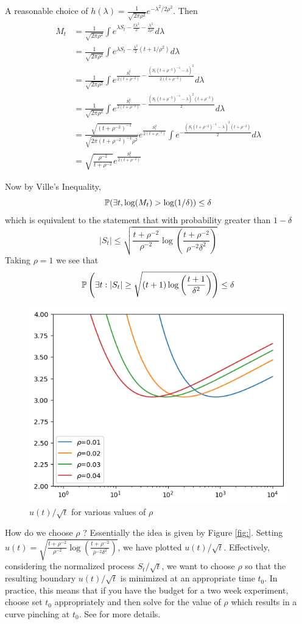 A reasonable choice of $h(\lambda) = \frac{1}{\sqrt{2\pi \rho^2}} e^{-\lambda^2/2\rho^2}$. Then
\begin{align*}
    M_t
    &= \frac{1}{\sqrt{2\pi \rho^2}} \int e^{\lambda S_t - \frac{t\lambda^2}{2} - \frac{\lambda^2}{2\rho^2} } d\lambda \\
    &= \frac{1}{\sqrt{2\pi \rho^2}} \int e^{\lambda S_t - \frac{\lambda^2}{2}(t+1/\rho^{2})} d\lambda\\
    &= \frac{1}{\sqrt{2\pi \rho^2}} \int e^{\frac{S_t^2}{2(t+\rho^{-2})} - \frac{(S_t(t+\rho^{-2})^{-1}-\lambda)^2}{2(t+\rho^{-2})}} d\lambda \\
    &= \frac{1}{\sqrt{2\pi \rho^2}} \int e^{\frac{S_t^2}{2(t+\rho^{-2})} - \frac{(S_t(t+\rho^{-2})^{-1}-\lambda)^2(t+\rho^{-2})}{2}} d\lambda \\
    &= \frac{\sqrt{(t+\rho^{-2})^{-1}}}{\sqrt{2\pi (t+\rho^{-2})^{-1} \rho^2}} e^{\frac{S_t^2}{2(t+\rho^{-2})}}\int e^{- \frac{(S_t(t+\rho^{-2})^{-1}-\lambda)^2(t+\rho^{-2})}{2}} d\lambda \\
    &= \sqrt{\frac{\rho^{-2}}{t+\rho^{-2}}} e^{\frac{S_t^2}{2(t+\rho^{-2})}}
\end{align*}

Now by Ville's Inequality, 
\[\P(\exists t, \log(M_t) > \log(1/\delta) )\leq \delta\]
which is equivalent to the statement that with probability greater than $1-\delta$
\[|S_t| \leq \sqrt{\frac{t + \rho^{-2}}{\rho^{-2}}\log\left(\frac{t+\rho^{-2}}{\rho^{-2} \delta^2}\right)}\]
Taking $\rho = 1$ we see that 
\[\P\left(\exists t: |S_t| \geq \sqrt{(t+1)\log\left(\frac{t+1}{\delta^2}\right)}\right) \leq \delta\]

\begin{figure}
    \centering
    \includegraphics[width=.5\linewidth]{sprt.png}
    \caption{$u(t)/\sqrt{t}$ for various values of $\rho$}
    \label{fig:my_label}
\end{figure}

How do we choose $\rho$ ? Essentially the idea is given by Figure \ref{fig:}. Setting $u(t) = \sqrt{\frac{t + \rho^{-2}}{\rho^{-2}}\log\left(\frac{t+\rho^{-2}}{\rho^{-2} \delta^2}\right)}$, we have plotted $u(t)/\sqrt{t}$. Effectively, considering the normalized process $S_t/\sqrt{t}$, we want to choose $\rho$ so that the resulting boundary $u(t)/\sqrt{t}$ is minimized at an appropriate time $t_0$. In practice, this means that if you have the budget for a two week experiment, choose set $t_0$ appropriately and then solve for the value of $\rho$ which results in a curve pinching at $t_0$. See \cite{howard2021time} for more details.\\


